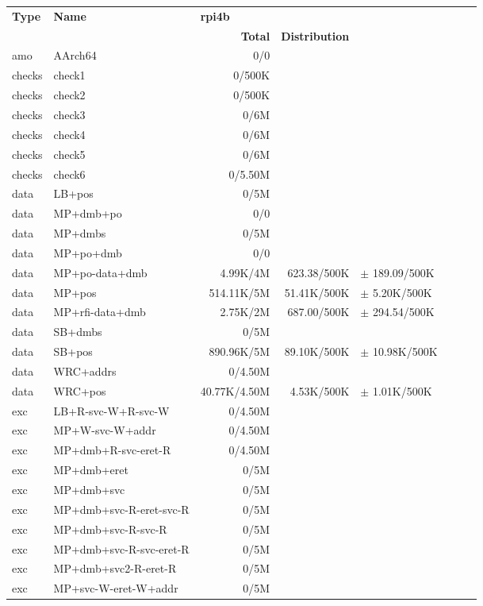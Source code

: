\begin{tabular}{l l  | r r l | r r l}
\textbf{Type} & \textbf{Name} & \multicolumn{3}{l}{\textbf{rpi4b}} \\
& & \textbf{Total} & \textbf{Distribution} &  \\
   amo&AArch64&0/0&&&\\
\hline
   checks&check1&0/500K&&&\\
\hline
   checks&check2&0/500K&&&\\
\hline
   checks&check3&0/6M&&&\\
\hline
   checks&check4&0/6M&&&\\
\hline
   checks&check5&0/6M&&&\\
\hline
   checks&check6&0/5.50M&&&\\
\hline
   data&LB+pos&0/5M&&&\\
\hline
   data&MP+dmb+po&0/0&&&\\
\hline
   data&MP+dmbs&0/5M&&&\\
\hline
   data&MP+po+dmb&0/0&&&\\
\hline
   data&MP+po-data+dmb&4.99K/4M&623.38/500K&$\pm$ 189.09/500K&\\
\hline
   data&MP+pos&514.11K/5M&51.41K/500K&$\pm$ 5.20K/500K&\\
\hline
   data&MP+rfi-data+dmb&2.75K/2M&687.00/500K&$\pm$ 294.54/500K&\\
\hline
   data&SB+dmbs&0/5M&&&\\
\hline
   data&SB+pos&890.96K/5M&89.10K/500K&$\pm$ 10.98K/500K&\\
\hline
   data&WRC+addrs&0/4.50M&&&\\
\hline
   data&WRC+pos&40.77K/4.50M&4.53K/500K&$\pm$ 1.01K/500K&\\
\hline
   exc&LB+R-svc-W+R-svc-W&0/4.50M&&&\\
\hline
   exc&MP+W-svc-W+addr&0/4.50M&&&\\
\hline
   exc&MP+dmb+R-svc-eret-R&0/4.50M&&&\\
\hline
   exc&MP+dmb+eret&0/5M&&&\\
\hline
   exc&MP+dmb+svc&0/5M&&&\\
\hline
   exc&MP+dmb+svc-R-eret-svc-R&0/5M&&&\\
\hline
   exc&MP+dmb+svc-R-svc-R&0/5M&&&\\
\hline
   exc&MP+dmb+svc-R-svc-eret-R&0/5M&&&\\
\hline
   exc&MP+dmb+svc2-R-eret-R&0/5M&&&\\
\hline
   exc&MP+svc-W-eret-W+addr&0/5M&&&\\

\end{tabular}
